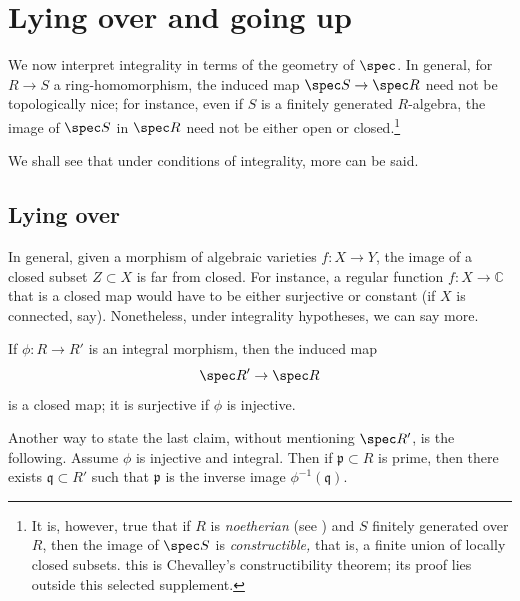 \section{Lying over and going up}
We now interpret integrality in terms of the geometry of $\spec$.
In general, for $R \to S$ a ring-homomorphism, the induced map $\spec S \to
\spec R$ need not be topologically nice; for instance, even if $S$ is a
finitely generated $R$-algebra, the image of $\spec S$ in $\spec R$ need not
be either open or closed.\footnote{It is, however, true that if $R$ is
\emph{noetherian} (see ) and $S$ finitely generated over
$R$, then the image of $\spec S$ is \emph{constructible,} that is, a finite
union of locally closed subsets. this is Chevalley's constructibility theorem; its proof lies outside this selected supplement.}

We shall see that under conditions of integrality, more can be said.



\subsection{Lying over}

In general, given a morphism of algebraic varieties $f: X \to Y$, the image of
a closed subset $Z \subset X$ is far from closed.  For instance, a regular function $f: X \to \mathbb{C}$ 
that is a closed map would have to be either surjective or constant (if $X$ is
connected, say).
Nonetheless, under integrality hypotheses, we can say more.

\begin{proposition} \label{lyingover}
If $\phi: R \to R'$ is an integral morphism, then the induced map
\[  \spec R' \to \spec R  \]
is a closed map; it is surjective if $\phi$ is injective.
 \end{proposition}

Another way to state the last claim, without mentioning $\spec R'$, is the
following. Assume $\phi$ is injective and integral. Then if
$\mathfrak{p} \subset R$ is prime, then there exists $\mathfrak{q} \subset R'$
such that $\mathfrak{p}$ is the inverse image $\phi^{-1}(\mathfrak{q})$.

